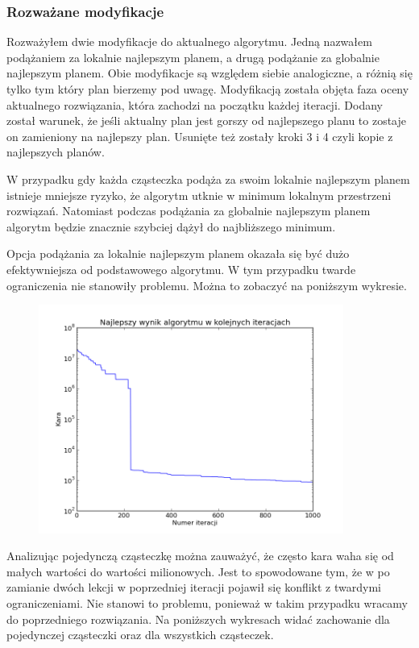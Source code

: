 \subsubsection{Rozważane modyfikacje}
\par Rozważyłem dwie modyfikacje do aktualnego algorytmu. Jedną nazwałem podążaniem za lokalnie najlepszym planem, a drugą podążanie za globalnie najlepszym planem. Obie modyfikacje są względem siebie analogiczne, a różnią się tylko tym który plan bierzemy pod uwagę. Modyfikacją została objęta faza oceny aktualnego rozwiązania, która zachodzi na początku każdej iteracji. Dodany został warunek, że jeśli aktualny plan jest gorszy od najlepszego planu to zostaje on zamieniony na najlepszy plan. Usunięte też zostały kroki 3 i 4 czyli kopie z najlepszych planów.
\par W przypadku gdy każda cząsteczka podąża za swoim lokalnie najlepszym planem istnieje mniejsze ryzyko, że algorytm utknie w minimum lokalnym przestrzeni rozwiązań. Natomiast podczas podążania za globalnie najlepszym planem algorytm będzie znacznie szybciej dążył do najbliższego minimum.
\par Opcja podążania za lokalnie najlepszym planem okazała się być dużo efektywniejsza od podstawowego algorytmu. W tym przypadku twarde ograniczenia nie stanowiły problemu. Można to zobaczyć na poniższym wykresie.
\begin{figure}[H]
\includegraphics[width=10cm]{img/localbest_penalty.png}
\centering
\end{figure}
\par Analizując pojedynczą cząsteczkę można zauważyć, że często kara waha się od małych wartości do wartości milionowych. Jest to spowodowane tym, że w po zamianie dwóch lekcji w poprzedniej iteracji pojawił się konflikt z twardymi ograniczeniami. Nie stanowi to problemu, ponieważ w takim przypadku wracamy do poprzedniego rozwiązania. Na poniższych wykresach widać zachowanie dla pojedynczej cząsteczki oraz dla wszystkich cząsteczek.
